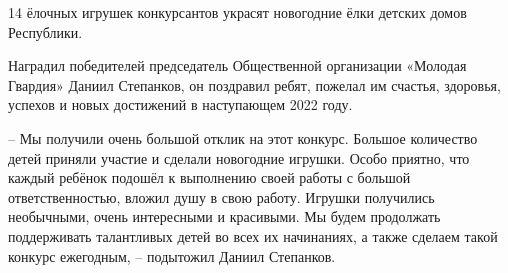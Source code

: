 14 ёлочных игрушек конкурсантов украсят новогодние ёлки детских домов
Республики.

Наградил победителей председатель Общественной организации «Молодая Гвардия»
Даниил Степанков, он поздравил ребят, пожелал им счастья, здоровья, успехов и
новых достижений в наступающем 2022 году.

– Мы получили очень большой отклик на этот конкурс. Большое количество детей
приняли участие и сделали новогодние игрушки. Особо приятно, что каждый ребёнок
подошёл к выполнению своей работы с большой ответственностью, вложил душу в
свою работу. Игрушки получились необычными, очень интересными и красивыми. Мы
будем продолжать поддерживать талантливых детей во всех их начинаниях, а также
сделаем такой конкурс ежегодным, – подытожил Даниил Степанков.
